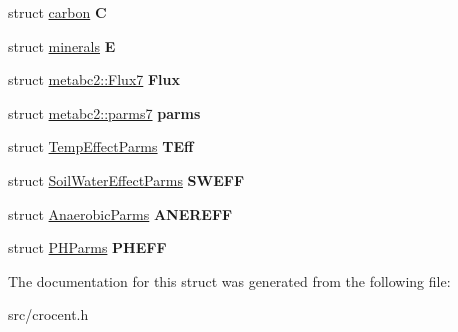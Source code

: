 \begin{DoxyCompactItemize}
\item 
\hypertarget{structmetabc2_a898236f758c40f46736ff48ab5ec9bfe}{struct \hyperlink{structcarbon}{carbon} {\bfseries C}}\label{structmetabc2_a898236f758c40f46736ff48ab5ec9bfe}

\item 
\hypertarget{structmetabc2_a557ad7e2f2d97a4f1e908175ec581b88}{struct \hyperlink{structminerals}{minerals} {\bfseries E}}\label{structmetabc2_a557ad7e2f2d97a4f1e908175ec581b88}

\item 
\hypertarget{structmetabc2_a0113aefc9b1e3023ed62f0c0ba011905}{struct \hyperlink{structmetabc2_1_1_flux7}{metabc2\-::\-Flux7} {\bfseries Flux}}\label{structmetabc2_a0113aefc9b1e3023ed62f0c0ba011905}

\item 
\hypertarget{structmetabc2_a6f824916d6b83eb9b1243beab592cd6d}{struct \hyperlink{structmetabc2_1_1parms7}{metabc2\-::parms7} {\bfseries parms}}\label{structmetabc2_a6f824916d6b83eb9b1243beab592cd6d}

\item 
\hypertarget{structmetabc2_aa453abe34e7f0dc6b755c1f5b36247d5}{struct \hyperlink{struct_temp_effect_parms}{Temp\-Effect\-Parms} {\bfseries T\-Eff}}\label{structmetabc2_aa453abe34e7f0dc6b755c1f5b36247d5}

\item 
\hypertarget{structmetabc2_a1340d9cb722ec601c412fb260176fd41}{struct \hyperlink{struct_soil_water_effect_parms}{Soil\-Water\-Effect\-Parms} {\bfseries S\-W\-E\-F\-F}}\label{structmetabc2_a1340d9cb722ec601c412fb260176fd41}

\item 
\hypertarget{structmetabc2_a3c1e3f1aef45c28f11a861164219dfa7}{struct \hyperlink{struct_anaerobic_parms}{Anaerobic\-Parms} {\bfseries A\-N\-E\-R\-E\-F\-F}}\label{structmetabc2_a3c1e3f1aef45c28f11a861164219dfa7}

\item 
\hypertarget{structmetabc2_aaea1c93d10276ff20021afa751cb53d1}{struct \hyperlink{struct_p_h_parms}{P\-H\-Parms} {\bfseries P\-H\-E\-F\-F}}\label{structmetabc2_aaea1c93d10276ff20021afa751cb53d1}

\end{DoxyCompactItemize}


The documentation for this struct was generated from the following file\-:\begin{DoxyCompactItemize}
\item 
src/crocent.\-h\end{DoxyCompactItemize}
